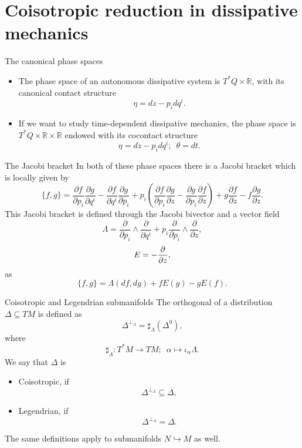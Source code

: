 \documentclass{beamer}
\theoremstyle{definition}
\begin{document}
\section{Coisotropic reduction in dissipative mechanics}
\begin{frame}{The canonical phase spaces}
    \begin{itemize}
        \item The phase space of an autonomous dissipative system is $T^\ast Q \times \mathbb{R}$, with its canonical \alert<1>{contact structure} $$\eta = dz - p_i dq^i.$$ \pause
        \item If we want to study time-dependent dissipative mechanics, the phase space is $T^\ast Q \times \mathbb{R} \times \mathbb{R}$ endowed with its \alert<2>{cocontact structure}
        $$\eta = dz - p_i dq^i; \,\,\, \theta = dt.$$
    \end{itemize}
\end{frame}
\begin{frame}{The Jacobi bracket}
In both of these phase spaces there is a \alert<1>{Jacobi bracket} which is locally given by $$\{f,g\} =  \frac{\partial f}{\partial p_i}\frac{\partial g}{\partial q^i}- \frac{\partial f}{\partial q^i} \frac{\partial g}{\partial p_i} + p_i\left (  \frac{\partial f}{\partial p_i}\frac{\partial g}{\partial z}- \frac{\partial g}{\partial p_i} \frac{\partial f}{\partial z} \right ) + g \frac{\partial f}{\partial z} - f\frac{\partial g}{\partial z}.$$ \pause This Jacobi bracket is defined through the \alert<2>{Jacobi bivector} and a vector field 
$$\Lambda = \frac{\partial}{\partial p_i}\wedge \frac{\partial}{\partial q^i} + p_i \frac{\partial}{\partial p_i} \wedge \frac{\partial}{\partial z},$$
$$E = - \pdv{z},$$
as $$\{ f, g \} = \Lambda(df, dg) + f E(g) - gE(f).$$
\end{frame}
\begin{frame}{Coisotropic and Legendrian submanifolds}
The orthogonal of a distribution $\Delta \subseteq TM$ is defined as $$\Delta^{\perp_\Lambda} = \sharp_\Lambda(\Delta^0),$$ where $$\sharp_\Lambda : T^\ast M \rightarrow TM; \,\,\, \alpha \mapsto \iota_\alpha \Lambda.$$\pause
We say that $\Delta$ is
\begin{itemize}
    \item \alert<2>{Coisotropic}, if $$\Delta^{\perp_\Lambda} \subseteq \Delta,$$ \pause
    \item \alert<3>{Legendrian}, if $$\Delta^{\perp_\Lambda} = \Delta.$$\pause
\end{itemize}
The same definitions apply to submanifolds $N \hookrightarrow M$ as well.
\end{frame}
\end{document}
